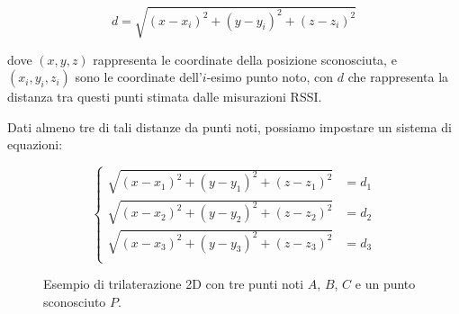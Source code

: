 \begin{equation}
    d = \sqrt{(x-x_i)^2 + (y-y_i)^2 + (z-z_i)^2}
\end{equation}

\noindent dove $(x,y,z)$ rappresenta le coordinate della posizione sconosciuta, e $(x_i,y_i, z_i)$ sono le coordinate dell'$i$-esimo punto noto, con $d$ che rappresenta la distanza tra questi punti stimata dalle misurazioni RSSI.

Dati almeno tre di tali distanze da punti noti, possiamo impostare un sistema di equazioni:

\begin{equation}
    \begin{cases}
        \sqrt{(x-x_1)^2 + (y-y_1)^2 + (z-z_1)^2} &= d_1 \\
        \sqrt{(x-x_2)^2 + (y-y_2)^2 + (z-z_2)^2} &= d_2 \\
        \sqrt{(x-x_3)^2 + (y-y_3)^2 + (z-z_3)^2} &= d_3 \\
    \end{cases}
\end{equation}

\begin{wrapfigure}{r}{0.5\textwidth}
    \centering
    \begin{adjustbox}{max size={\textwidth}{\textheight}}
    \end{adjustbox}
    \caption{Esempio di trilaterazione 2D con tre punti noti $A$, $B$, $C$ e un punto sconosciuto $P$.}
    \label{fig:trilaterazione}
\end{wrapfigure}

